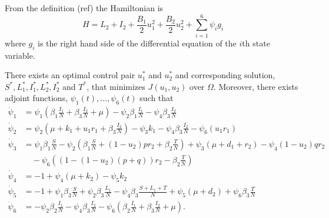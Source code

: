     From the definition (ref) the Hamiltonian is
    $$
        H = L_2 + I_2 + \dfrac{B_1}{2} u_{1}^{2} + \dfrac{B_2}{2} u_{2}^{2} +
            \sum_{i=1}^{6} \psi_i g_i
    $$
    where $g_i$ is the right hand side of the differential equation of the $i$th
    state variable.
    
    \begin{theorem}
        There exists an optimal control pair $u_{1}^{*}$ and $u_{2}^{*}$ and 
        corresponding solution, $S^{*}, L_{1}^{*}, I_{1}^{*}, L_{2}^{*}, I_{2}^{*}$
        and $T^{*}$, that minimizes $J(u_1,u_2)$ over $\Omega$. Moreover, there exists
        adjoint functions, $\psi_{1}(t), \ldots, \psi_{6}(t)$ such that
        \begin{align*}
    	    \dot{\psi}_1	&= 
    	        \psi_{1} \left(\beta_{1}\frac{I_1}{N} + \beta_{3}\frac{I_2}{N} 
    	            + \mu \right)
    	       -\psi_{2} \beta_{1}\frac{I_1}{N}
    	       -\psi_{4} \beta_{3}\frac{I_2}{N}
            \\
            \dot{\psi}_2	&= 
    	        \psi_{2} \left( \mu + k_1 + u_1 r_1 + \beta_{3}\frac{I_2}{N}         \right)
    	       -\psi_{3} k_1
    	       -\psi_{4} \beta_{3}\frac{I_2}{N}
    	       -\psi_{6} \left( u_1 r_1 \right)
            \\
            \dot{\psi}_3	&= 
    	        \psi_{1} \beta_{1}\frac{S}{N}
    	       -\psi_{2} \left( \beta_{1}\frac{S}{N} + (1 - u_2)pr_2 +
    	            \beta_{2}\frac{T}{N} \right)
    	       +\psi_{3} \left( \mu + d_1 + r_2 \right)
    	       -\psi_{4} \left(1 - u_2\right)qr_2  \\
    	       &\quad -\psi_{6} \left((1 - ( 1- u_2)(p+q))r_2 - \beta_{2}\frac{T}{N}
    	            \right)
    	   \\
    	   \dot{\psi}_4	&= -1
    	       +\psi_{4} \left( \mu + k_2 \right)
    	       -\psi_{5} k_2
            \\
            \dot{\psi}_5	&= -1
    	       +\psi_{1} \beta_{3}\frac{S}{N} 
    	       +\psi_{2} \beta_{3}\frac{L_1}{N}
    	       -\psi_{4} \beta_{3}\frac{S + L_1 + T}{N}
    	       +\psi_{5} \left( \mu + d_2 \right)
    	       +\psi_{6} \beta_{3}\frac{T}{N}
            \\
            \dot{\psi}_6	&= 
    	       -\psi_{2} \beta_{2}\frac{I_1}{N}
    	       -\psi_{4} \beta_{3}\frac{I_2}{N}
    	       -\psi_{6} \left( \beta_{2}\frac{I_1}{N} + \beta_{3}\frac{I_2}{N}
    	            + \mu \right).
        \end{align*}
    \end{theorem}
    

